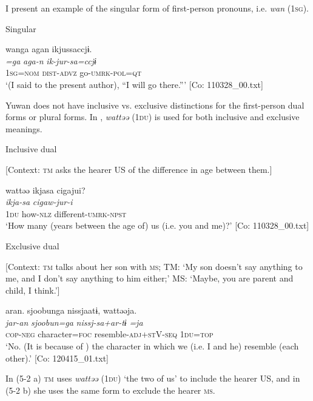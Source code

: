 I present an example of the singular form of first-person pronouns, i.e. \textit{wan} (1\textsc{sg}).

\ea \label{ex:5:2}   Singular

\glll  wanga  agan  ikjussaccjɨ.\\
\textit{=ga}  \textit{aga-n}  \textit{ik-jur-sa=ccjɨ}\\
1\textsc{sg}=\textsc{nom}  \textsc{dist}-\textsc{advz}  go-\textsc{umrk}-\textsc{pol}=\textsc{qt}\\
\glt ‘(I said to the present author), “I will go there.”’ [Co: 110328\_00.txt]
\z

Yuwan does not have inclusive vs. exclusive distinctions for the first-person dual forms or plural forms. In , \textit{wattəə} (1\textsc{du}) is used for both inclusive and exclusive meanings.

\ea \label{ex:5:3}  \ea \label{ex:5:3a} Inclusive dual

    [Context: \textsc{tm} asks the hearer US of the difference in age between them.]

\glll  wattəə  ikjasa  cigajui?\\
\textit{}  \textit{ikja-sa}  \textit{cigaw-jur-i}\\
1\textsc{du}  how-\textsc{nlz}  different-\textsc{umrk}-\textsc{npst}\\
\glt ‘How many (years between the age of) us (i.e. you and me)?’ [Co: 110328\_00.txt]

 \ex \label{ex:5:b} Exclusive dual

    [Context: \textsc{tm} talks about her son with \textsc{ms}; TM: ‘My son doesn’t say anything to me, and I don’t say anything to him either;’ MS: ‘Maybe, you are parent and child, I think.’]

\glll  aran.  sjoobunga  nissjaatɨ,  wattəəja.\\
\textit{jar-an}  \textit{sjoobun=ga}  \textit{nissj-sa+ar-tɨ}  \textit{=ja}\\
\textsc{cop}-\textsc{neg}  character=\textsc{foc}  resemble-\textsc{adj}+\textsc{st}V-\textsc{seq}  1\textsc{du}=\textsc{top}\\
\glt ‘No. (It is because of ) the character in which we (i.e. I and he) resemble (each other).’ [Co: 120415\_01.txt]
\z
\z

In (5-2 a) \textsc{tm} uses \textit{wattəə} (1\textsc{du}) ‘the two of us’ to include the hearer US, and in (5-2 b) she uses the same form to exclude the hearer \textsc{ms}.


